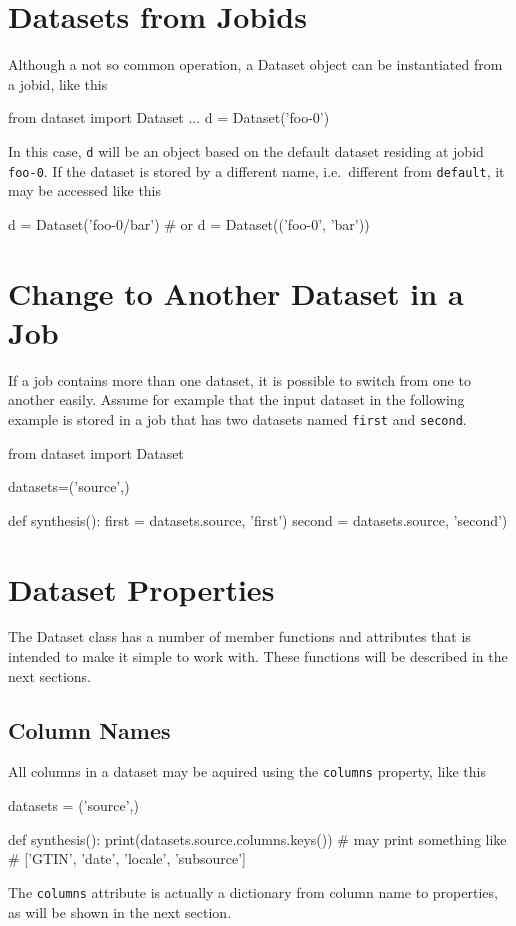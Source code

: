 \section{Datasets from Jobids}
Although a not so common operation, a Dataset object can be
instantiated from a jobid, like this
\begin{python}
from dataset import Dataset
...
d = Dataset('foo-0')
\end{python}
In this case, \texttt{d} will be an object based on the default
dataset residing at jobid \texttt{foo-0}.  If the dataset is stored by
a different name, i.e.\ different from \texttt{default}, it may be
accessed like this
\begin{python}
d = Dataset('foo-0/bar')
# or
d = Dataset(('foo-0', 'bar'))
\end{python}


\section{Change to Another Dataset in a Job}
If a job contains more than one dataset, it is possible to switch from
one to another easily.  Assume for example that the input dataset in
the following example is stored in a job that has two datasets
named \texttt{first} and \texttt{second}.
\begin{python}
from dataset import Dataset

datasets=('source',)

def synthesis():
    first = datasets.source, 'first')
    second = datasets.source, 'second')
\end{python}


                      

\section{Dataset Properties}
The Dataset class has a number of member functions and attributes that
is intended to make it simple to work with.  These functions will be
described in the next sections.


\subsection*{Column Names}
All columns in a dataset may be aquired using the \texttt{columns}
property, like this
\begin{python}
datasets = ('source',)

def synthesis():
  print(datasets.source.columns.keys())
  # may print something like
  # ['GTIN', 'date', 'locale', 'subsource']
\end{python}
The \texttt{columns} attribute is actually a dictionary from column
name to properties, as will be shown in the next section.


